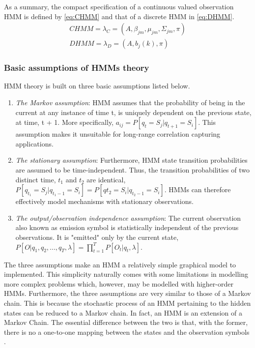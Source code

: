 As a summary, the compact specification of a continuous valued observation HMM is defined by \ref{eq:CHMM} and that of a discrete HMM in \ref{eq:DHMM}.
\begin{align} 
	CHMM = \lambda_C = (A, \beta_{jm}, \mu_{jm}, \Sigma_{jm}, \pi) \label{eq:CHMM} \\
	DHMM = \lambda_D = (A, b_j(k), \pi) \label{eq:DHMM}
\end{align}

\subsubsection{Basic assumptions of HMMs theory}
HMM theory is built on three basic assumptions listed below.
\begin{enumerate}
\label{con:markov} \item \textit{The Markov assumption}: HMM assumes that the probability of being in the current	at any instance of time t, is uniquely dependent on the previous state, at time, t + 1. More specifically, \(a_{ij} = P[q_t = S_j|q_{t+1}=S_i]\). This assumption makes it unsuitable for long-range correlation capturing applications.

\item \textit{The stationary assumption}: Furthermore, HMM state transition probabilities are assumed to be time-independent. Thus, the transition probabilities of two distinct time, \(t_1\) and \(t_2\) are identical, \(P[q_{t_1} = S_j|q_{t_1 -1} = S_i] = P[q{t_2}=S_i|q_{t_2-1} = S_i]\). HMMs can therefore effectively model mechanisms with stationary observations.

\item \textit{The output/observation independence assumption}: The current observation also known as emission symbol is statistically independent of the previous observations. It is "emitted" only by the current state, \(P[O|q_1, q_2, ..., q_T, \lambda]=\prod_{t=1}^{T}P[O_t|q_t, \lambda]\).
\end{enumerate} 
The three assumptions make an HMM a relatively simple graphical model to implemented. This simplicity naturally comes with some limitations in modelling more complex problems which, however, may be modelled with higher-order HMMs. %
Furthermore, the three assumptions are very similar to those of a Markov chain. This is because the stochastic process of an HMM pertaining to the hidden states can be reduced to a Markov chain. In fact, an HMM is an extension of a Markov Chain. The essential difference between the two is that, with the former, there is no a one-to-one mapping between the states and the observation symbols \cite{biol1998}.

